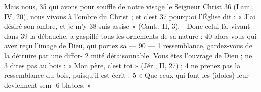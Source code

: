 Mais nous,	 
35	 	qui avons pour souffle de notre visage le Seigneur Christ	 
36	 	(Lam., IV, 20), nous vivons à l'ombre du Christ ; et c'est	 
37	 	pourquoi l'Église dit : « J'ai désiré son ombre, et je m'y	 
38	 	suis assise » (Cant., II, 3). - Donc celui-là, vivant dans	 
39	 	la débauche, a gaspillé tous les ornements de sa nature :	 
40	 	alors vous qui avez reçu l'image de Dieu, qui portez sa	 
 	--- 90 ---	 
1	 	ressemblance, gardez-vous de la détruire par une diffor-	 
2	 	mité déraisonnable. Vous êtes l'ouvrage de Dieu ; ne	 
3	 	dites pas au bois : « Mon père, c'est toi » (Jér., II, 27) ;	 
4	 	ne prenez pas la ressemblance du bois, puisqu'il est écrit :	 
5	 	« Que ceux qui font les (idoles) leur deviennent sem-	 
6	 	blables. »